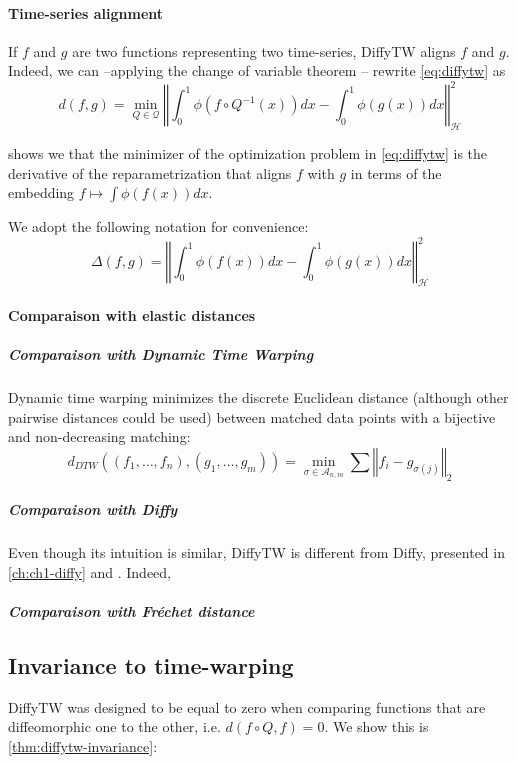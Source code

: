 \paragraph{Time-series alignment}
If $f$ and $g$ are two functions representing two time-series, DiffyTW aligns $f$ and $g$. Indeed, we can --applying the change of variable theorem -- rewrite \cref{eq:diffytw} as
\begin{equation}\label{eq:diffytw-Q}
    d(f, g) = \min_{Q \in \mathcal Q} \left\Vert \int_0^1 \phi(f \circ Q^{-1}(x))dx - \int_0^1\phi(g(x))dx\right\Vert^2_\mathcal H
\end{equation}

\noindent {} shows we that the minimizer of the optimization problem in \cref{eq:diffytw} is the derivative of the reparametrization that aligns $f$ with $g$ in terms of the embedding $f \mapsto \int \phi(f(x))dx$.

We adopt the following notation for convenience:
\begin{equation}\label{def:diffytw-delta}
\Delta(f , g) = \left\Vert \int_0^1 \phi(f(x))dx - \int_0^1\phi(g(x))dx\right\Vert^2_\mathcal H
\end{equation}


\paragraph{Comparaison with elastic distances}
\subparagraph{Comparaison with Dynamic Time Warping} Dynamic time warping minimizes the discrete Euclidean distance (although other pairwise distances could be used) between matched data points with a bijective and non-decreasing matching:
\begin{equation}\label{eq:dtw-1}
d_{DTW}((f_1, \ldots, f_n), (g_1, \ldots, g_m)) = \min_{\sigma \in\mathcal A_{n, m}} \sum \left\Vert f_i - g_{\sigma(j)}\right\Vert_2
\end{equation}


\subparagraph{Comparaison with Diffy}
Even though its intuition is similar, DiffyTW is different from Diffy, presented in \cref{ch:ch1-diffy} and \cite{cantelobre-diffy}. Indeed,

\subparagraph{Comparaison with Fréchet distance}



\subsection{Invariance to time-warping}
DiffyTW was designed to be equal to zero when comparing functions that are diffeomorphic one to the other, i.e. $d(f\circ Q, f)=0$. We show this is \cref{thm:diffytw-invariance}:


